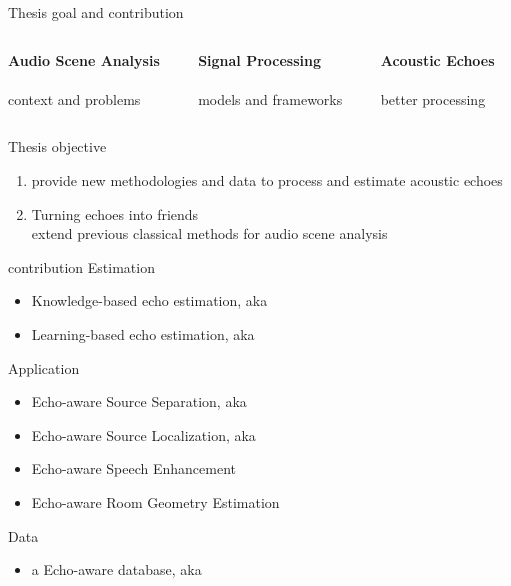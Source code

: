 \begin{frame}[t]{Thesis goal and contribution}

    \vfill
    \begin{columns}[onlytextwidth]
        \begin{column}[T]{0.3\linewidth}
            \centering
            \textbf{Audio Scene Analysis}
            \\\downarrow
            \\context and problems
        \end{column}\hfill
        \begin{column}[T]{0.3\linewidth}
            \centering
            \textbf{Signal Processing}
            \\\downarrow
            \\models and frameworks
        \end{column}\hfill
        \begin{column}[T]{0.3\linewidth}
            \centering
            \textbf{Acoustic Echoes}
            \\\downarrow
            \\better processing
        \end{column}\hfill
    \end{columns}

    \vfill
    \begin{mydefblock}{Thesis objective}
        \begin{enumerate}
        \item provide new methodologies and data to process and estimate acoustic echoes
        \item Turning echoes into friends \cite{Riberio}
        \\extend previous classical methods for audio scene analysis
        \end{enumerate}
    \end{mydefblock}

    \vfill
    \begin{block}{contribution}
        Estimation
        \begin{itemize}
            \item Knowledge-based echo estimation, aka \blaster
            \item Learning-based echo estimation, aka \lantern
        \end{itemize}
        Application
        \begin{itemize}
            \item Echo-aware Source Separation, aka \separake
            \item Echo-aware Source Localization, aka \mirage
            \item Echo-aware Speech Enhancement
            \item Echo-aware Room Geometry Estimation
        \end{itemize}
        Data
        \begin{itemize}
            \item a Echo-aware database, aka \dechorate
        \end{itemize}
    \end{block}


\end{frame}
